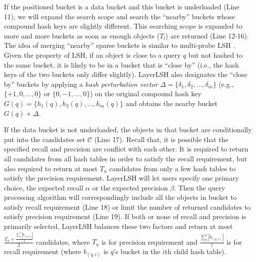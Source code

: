 If the positioned bucket is a data bucket and this bucket is underloaded (Line 11), we will expand the search scope and search the ``nearby'' buckets whose compound hash keys are slightly different. This searching scope is expanded to more and more buckets as soon as enough objects ($T_l$) are returned (Line 12-16). The idea of merging ``nearby'' sparse buckets is similar to multi-probe LSH \cite{mplsh}. Given the property of LSH, if an object is close to a query $q$ but not hashed to the same bucket, it is likely to be in a bucket that is ``close by'' (i.e., the hash keys of the two buckets only differ slightly). LayerLSH also designates the ``close by'' buckets by applying a \emph{hash perturbation vector} $\Delta=\{\delta_1,\delta_2,\ldots,\delta_m\}$ (e.g., $\{+1,0,\ldots,0\}$ or $\{0,-1,\ldots,0\}$) on the original compound hash key $G(q)=\{h_1(q),h_2(q),\ldots,h_m(q)\}$ and obtains the nearby bucket $G(q)+\Delta$.



If the data bucket is not underloaded, the objects in that bucket are conditionally put into the candidates set $\mathcal{C}$ (Line 17). Recall that, it is possible that the specified recall and precision are conflict with each other. It is required to return all candidates from all hash tables in order to satisfy the recall requirement, but also required to return at most $T_u$ candidates from only a few hash tables to satisfy the precision requirement. LayerLSH will let users specify one primary choice, the expected recall $\alpha$ or the expected precision $\beta$. Then the query processing algorithm will correspondingly include all the objects in bucket to satisfy recall requirement (Line 18) or limit the number of returned candidates to satisfy precision requirement (Line 19). If both or none of recall and precision is primarily selected, LayerLSH balances these two factors and return at most $\frac{T_u+\frac{\sum_{i}^{l}|b_{(q,i)}|}{l}}{2}$ candidates, where $T_u$ is for precision requirement and $\frac{\sum_{i}^{l}|b_{(q,i)}|}{l}$ is for recall requirement (where $b_{(q,i)}$ is $q$'s bucket in the $i$th child hash table).




